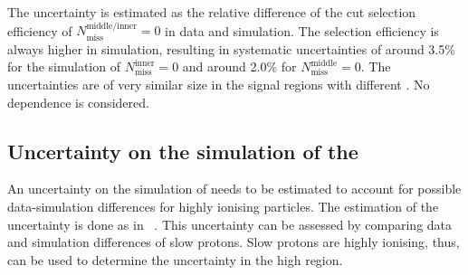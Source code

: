 The uncertainty is estimated as the relative difference of the cut selection efficiency of $N_{\text{miss}}^{\text{middle/inner}}=0$ in data and simulation.
The selection efficiency is always higher in simulation, resulting in systematic uncertainties of around 3.5\% for the simulation of $N_{\text{miss}}^{\text{inner}}=0$ and around 2.0\% for $N_{\text{miss}}^{\text{middle}}=0$.
The uncertainties are of very similar size in the signal regions with different \pt.
No \ias dependence is considered.

\subsection*{Uncertainty on the simulation of the \ias}
An uncertainty on the simulation of \ias needs to be estimated to account for possible data-simulation differences for highly ionising particles.
The estimation of the \ias uncertainty is done as in ~\cite{FIXME}.
This uncertainty can be assessed by comparing data and simulation differences of slow protons.
Slow protons are highly ionising, thus, can be used to determine the uncertainty in the high \ias region.

